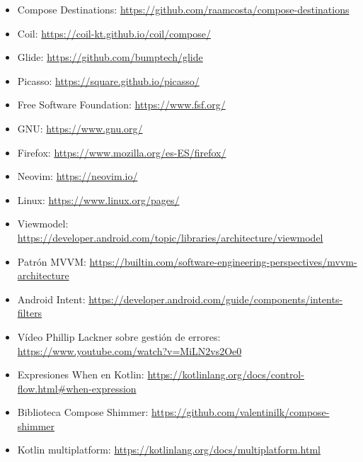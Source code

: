 \begin{itemize}
  \item Compose Destinations: \url{https://github.com/raamcosta/compose-destinations}
  \item Coil: \url{https://coil-kt.github.io/coil/compose/}
  \item Glide: \url{https://github.com/bumptech/glide}
  \item Picasso: \url{https://square.github.io/picasso/}
  \item Free Software Foundation: \url{https://www.fsf.org/}
  \item GNU: \url{https://www.gnu.org/}
  \item Firefox: \url{https://www.mozilla.org/es-ES/firefox/}
  \item Neovim: \url{https://neovim.io/}
  \item Linux: \url{https://www.linux.org/pages/}
  \item Viewmodel: \url{https://developer.android.com/topic/libraries/architecture/viewmodel}
  \item Patrón MVVM: \url{https://builtin.com/software-engineering-perspectives/mvvm-architecture}
  \item Android Intent: \url{https://developer.android.com/guide/components/intents-filters}
  \item Vídeo Phillip Lackner sobre gestión de errores: \url{https://www.youtube.com/watch?v=MiLN2vs2Oe0}
  \item Expresiones When en Kotlin: \url{https://kotlinlang.org/docs/control-flow.html#when-expression}
  \item Biblioteca Compose Shimmer: \url{https://github.com/valentinilk/compose-shimmer}
  \item Kotlin multiplatform: \url{https://kotlinlang.org/docs/multiplatform.html}
\end{itemize}

